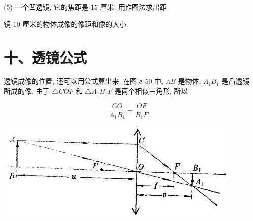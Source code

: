 \documentclass[10pt]{article}
\begin{document}
\begin{center}
\end{center}

(5) 一个凹透镜, 它的焦距是 15 厘米. 用作图法求出距

镜 10 厘米的物体成像的像距和像的大小.

\section*{十、透镜公式}

透镜成像的位置, 还可以用公式算出来. 在图 8-50 中, \({AB}\) 是物体, \({A}_{1}{B}_{1}\) 是凸透镜所成的像. 由于 \(\bigtriangleup {COF}\) 和 \(\bigtriangleup {A}_{1}{B}_{1}F\) 是两个相似三角形, 所以

\[
\frac{CO}{{A}_{1}{B}_{1}} = \frac{OF}{{B}_{1}F}
\]

\begin{center}
\includegraphics[max width=0.9\textwidth]{images/01913056-1f15-74d8-9184-9aab52c9d66b_282_736478.jpg}
\end{center}
\end{document}
